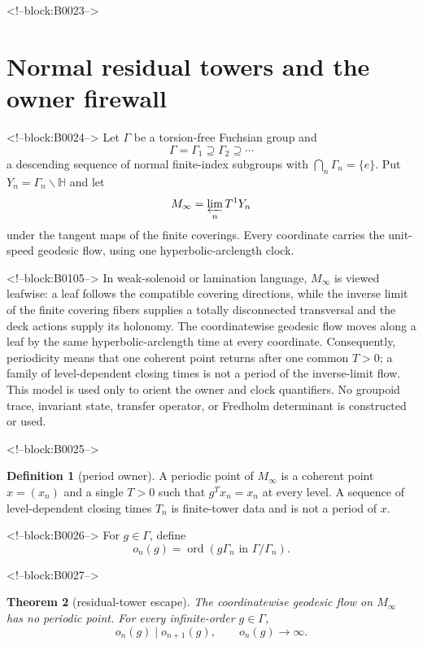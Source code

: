 \documentclass[11pt]{article}
\newtheorem{theorem}{Theorem}[section]
\theoremstyle{definition}
\newtheorem{definition}[theorem]{Definition}
\theoremstyle{remark}
\newcommand{\HH}{\mathbb H}
\newcommand{\ord}{\operatorname{ord}}
\begin{document}
<!--block:B0023-->
\section{Normal residual towers and the owner firewall}

<!--block:B0024-->
Let $\Gamma$ be a torsion-free Fuchsian group and
\[
\Gamma=\Gamma_1\supseteq\Gamma_2\supseteq\cdots
\]
a descending sequence of normal finite-index subgroups with
$\bigcap_n\Gamma_n=\{e\}$. Put $Y_n=\Gamma_n\backslash\HH$ and let
\[
M_\infty=\varprojlim_n T^1Y_n
\]
under the tangent maps of the finite coverings. Every coordinate carries the unit-speed geodesic flow, using one hyperbolic-arclength clock.

<!--block:B0105-->
In weak-solenoid or lamination language, $M_\infty$ is viewed leafwise: a leaf follows the compatible covering directions, while the inverse limit of the finite covering fibers supplies a totally disconnected transversal and the deck actions supply its holonomy. The coordinatewise geodesic flow moves along a leaf by the same hyperbolic-arclength time at every coordinate. Consequently, periodicity means that one coherent point returns after one common $T>0$; a family of level-dependent closing times is not a period of the inverse-limit flow. This model is used only to orient the owner and clock quantifiers. No groupoid trace, invariant state, transfer operator, or Fredholm determinant is constructed or used.

<!--block:B0025-->
\begin{definition}[period owner]
A periodic point of $M_\infty$ is a coherent point $x=(x_n)$ and a single $T>0$ such that $g^T x_n=x_n$ at every level. A sequence of level-dependent closing times $T_n$ is finite-tower data and is not a period of $x$.
\end{definition}

<!--block:B0026-->
For $g\in\Gamma$, define
\[
o_n(g)=\ord(g\Gamma_n\text{ in }\Gamma/\Gamma_n).
\]

<!--block:B0027-->
\begin{theorem}[residual-tower escape]\label{thm:residual}
The coordinatewise geodesic flow on $M_\infty$ has no periodic point. For every infinite-order $g\in\Gamma$,
\[
o_n(g)\mid o_{n+1}(g),
\qquad
o_n(g)\longrightarrow\infty.
\]
\end{theorem}
\end{document}
